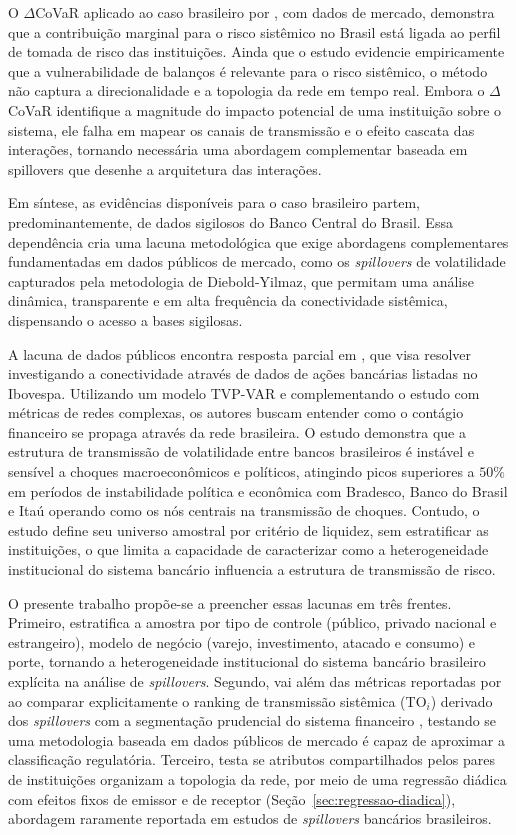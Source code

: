 \documentclass[12pt, a4paper, oneside, english, brazil]{abntex2}
\begin{document}
O $\Delta$CoVaR aplicado ao caso brasileiro por \textcite{moura2024}, com dados de mercado,
demonstra que a contribuição marginal para o risco sistêmico no Brasil está ligada ao perfil de
tomada de risco das instituições. Ainda que o estudo evidencie empiricamente
que a vulnerabilidade de balanços é relevante para o risco sistêmico, o método não captura
a direcionalidade e a topologia da rede em tempo real. Embora o $\Delta$CoVaR
identifique a magnitude do impacto potencial de uma instituição sobre o sistema, ele falha
em mapear os canais de transmissão e o efeito cascata das interações, tornando necessária 
uma abordagem complementar baseada em spillovers que desenhe a arquitetura das interações.

Em síntese, as evidências disponíveis para o caso brasileiro partem, predominantemente,
de dados sigilosos do Banco Central do Brasil. Essa dependência cria uma lacuna metodológica
que exige abordagens complementares fundamentadas em dados públicos de mercado, como os
\textit{spillovers} de volatilidade capturados pela metodologia de Diebold-Yilmaz, que
permitam uma análise dinâmica, transparente e em alta frequência da conectividade
sistêmica, dispensando o acesso a bases sigilosas.

A lacuna de dados públicos encontra resposta parcial em \textcite{silva2025}, que visa 
resolver investigando a conectividade através de dados de ações bancárias listadas no Ibovespa. 
Utilizando um modelo TVP-VAR e complementando o estudo com métricas de redes complexas,
os autores buscam entender como o contágio financeiro se propaga através da rede brasileira. 
O estudo demonstra que a estrutura
de transmissão de volatilidade entre bancos brasileiros é instável e sensível a choques 
macroeconômicos e políticos, atingindo picos superiores a $50\%$ em períodos de instabilidade
política e econômica com Bradesco, Banco do Brasil e Itaú operando como os nós centrais
na transmissão de choques. Contudo, o estudo define seu universo amostral por critério de
liquidez, sem estratificar as instituições, o que limita a capacidade de caracterizar como a 
heterogeneidade institucional do sistema bancário influencia a estrutura de transmissão
de risco.

O presente trabalho propõe-se a preencher essas lacunas em três frentes. 
Primeiro, estratifica a amostra por tipo de controle (público, privado nacional e estrangeiro), modelo de negócio (varejo, investimento, atacado e consumo) e porte, tornando a 
heterogeneidade institucional do sistema bancário brasileiro explícita na análise de 
\textit{spillovers}. Segundo, vai além das métricas reportadas por \textcite{silva2025} 
ao comparar explicitamente o ranking de transmissão sistêmica (TO$_i$) derivado dos \textit{spillovers}
com a segmentação prudencial do sistema financeiro \parencite{cmn4553_2017}, testando se uma 
metodologia baseada em dados públicos de mercado é capaz de aproximar a classificação 
regulatória. Terceiro, testa se atributos compartilhados pelos pares de instituições
organizam a topologia da rede, por meio de uma regressão diádica com
efeitos fixos de emissor e de receptor (Seção~\ref{sec:regressao-diadica}),
abordagem raramente reportada em estudos de \textit{spillovers} bancários
brasileiros.
\end{document}

